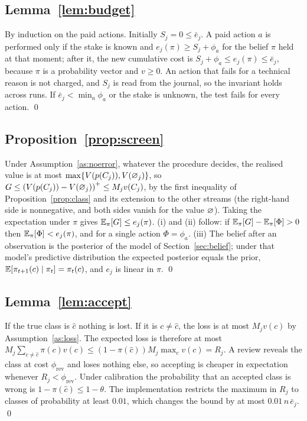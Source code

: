 \subsection*{Lemma~\ref{lem:budget}}
By induction on the paid actions. Initially $S_j=0\le\bar e_j$. A paid action $a$ is performed only if the stake is
known and $e_j(\pi)\ge S_j+\phi_a$ for the belief $\pi$ held at that moment; after it, the new cumulative cost is
$S_j+\phi_a\le e_j(\pi)\le\bar e_j$, because $\pi$ is a probability vector and $v\ge0$. An action that fails for a
technical reason is not charged, and $S_j$ is read from the journal, so the invariant holds across runs. If
$\bar e_j<\min_a\phi_a$ or the stake is unknown, the test fails for every action. \qed

\subsection*{Proposition~\ref{prop:screen}}
Under Assumption~\ref{as:noerror}, whatever the procedure decides, the realised value is at most
$\max\{V(p(C_j)),V(\varnothing_j)\}$, so $G\le\left(V(p(C_j))-V(\varnothing_j)\right)^{+}\le M_jv(C_j)$, by the first inequality of
Proposition~\ref{prop:class} and its extension to the other streams (the right-hand side is nonnegative, and both
sides vanish for the value $\varnothing$). Taking the expectation under $\pi$ gives $\mathbb{E}_\pi[G]\le e_j(\pi)$. (i) and (ii)
follow: if $\mathbb{E}_\pi[G]-\mathbb{E}_\pi[\Phi]>0$ then $\mathbb{E}_\pi[\Phi]<e_j(\pi)$, and for a single action $\Phi=\phi_a$. (iii)
The belief after an observation is the posterior of the model of Section~\ref{sec:belief}; under that model's
predictive distribution the expected posterior equals the prior, $\mathbb{E}[\pi_{t+1}(c)\mid\pi_t]=\pi_t(c)$, and $e_j$ is
linear in $\pi$. \qed

\subsection*{Lemma~\ref{lem:accept}}
If the true class is $\hat c$ nothing is lost. If it is $c\ne\hat c$, the loss is at most $M_jv(c)$ by
Assumption~\ref{as:loss}. The expected loss is therefore at most
$M_j\sum_{c\ne\hat c}\pi(c)v(c)\le(1-\pi(\hat c))M_j\max_cv(c)=R_j$. A review reveals the class at cost
$\phi_{\mathrm{rev}}$ and loses nothing else, so accepting is cheaper in expectation whenever
$R_j<\phi_{\mathrm{rev}}$. Under calibration the probability that an accepted class is wrong is
$1-\pi(\hat c)\le1-\theta$. The implementation restricts the maximum in $R_j$ to classes of probability at least
$0.01$, which changes the bound by at most $0.01\,n\,\bar e_j$. \qed

